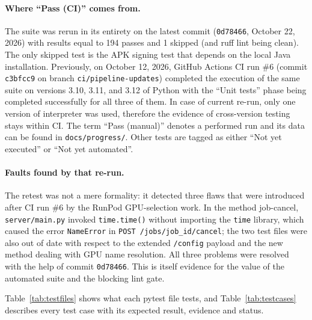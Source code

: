 \paragraph{Where ``Pass (CI)'' comes from.} The suite was rerun in its entirety on the latest commit (\texttt{0d78466}, October 22, 2026) with results equal to 194 passes and 1 skipped (and ruff lint being clean). The only skipped test is the APK signing test that depends on the local Java installation. Previously, on October 12, 2026, GitHub Actions CI run \#6 (commit \texttt{c3bfcc9} on branch \texttt{ci/pipeline-updates}) completed the execution of the same suite on versions 3.10, 3.11, and 3.12 of Python with the ``Unit tests'' phase being completed successfully for all three of them. In case of current re-run, only one version of interpreter was used, therefore the evidence of cross-version testing stays within CI. The term ``Pass (manual)'' denotes a performed run and its data can be found in \texttt{docs/progress/}. Other tests are tagged as either ``Not yet executed'' or ``Not yet automated''.

\paragraph{Faults found by that re-run.} The retest was not a mere formality: it detected three flaws that were introduced after CI run \#6 by the RunPod GPU-selection work. In the method job-cancel, \texttt{server/main.py} invoked \texttt{time.time()} without importing the \texttt{time} library, which caused the error \texttt{NameError} in \texttt{POST /jobs/job\_id/cancel}; the two test files were also out of date with respect to the extended \texttt{/config} payload and the new method dealing with GPU name resolution. All three problems were resolved with the help of commit \texttt{0d78466}. This is itself evidence for the value of the automated suite and the blocking lint gate.

Table~\ref{tab:testfiles} shows what each pytest file tests, and Table~\ref{tab:testcases} describes every test case with its expected result, evidence and status.

